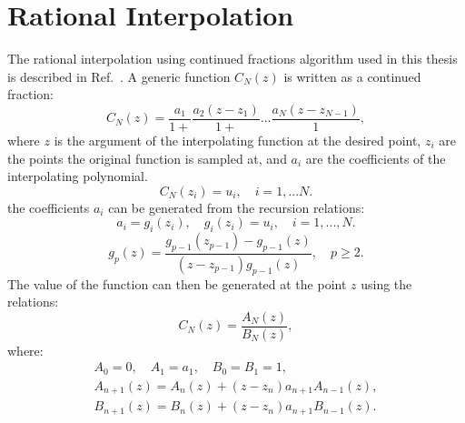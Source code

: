 \chapter{Rational Interpolation}
\label{app:ratint}
The rational interpolation using continued fractions algorithm
used in this thesis is described in Ref.~\cite{vidbergserene77}.
A generic function $C_N(z)$ is written as a continued fraction:
%
\begin{equation}
C_{N}(z) = \frac{a_{1}}{1+}\frac{a_{2}(z-z_{1})}{1+}...\frac{a_{N}(z-z_{N-1})}{1},
\end{equation}
%
where $z$ is the argument of the interpolating function
at the desired point, $z_{i}$ are the points the original function is sampled at,
and $a_{i}$ are the coefficients of the interpolating polynomial.
%
\begin{equation}
C_{N}(z_{i}) = u_{i}, \quad i=1,...N.
\end{equation}
%
the coefficients $a_{i}$ can be generated from the recursion relations:
%
\begin{equation}
a_{i} = g_{i}(z_{i}),\quad g_{i}(z_{i})=u_{i},\quad i=1,...,N.
\end{equation}
%
\begin{equation}
g_{p}(z) = \frac{g_{p-1}(z_{p-1}) - g_{p-1}(z)}{(z - z_{p-1})g_{p-1}(z)}, \quad p \geq 2.
\end{equation}
%
The value of the function can then be generated at the point $z$ using the relations:
%
\begin{equation}
C_{N}(z) = \frac{A_{N}(z)}{B_{N}(z)},
\end{equation}
%
where:
%
\begin{eqnarray}
A_{0}=0, \quad A_{1} = a_{1}, \quad B_{0}=B_{1}=1, \nonumber \\
A_{n+1}(z) = A_{n}(z) + (z-z_{n})a_{n+1}A_{n-1}(z), \nonumber \\
B_{n+1}(z) = B_{n}(z) + (z-z_{n})a_{n+1}B_{n-1}(z).
\end{eqnarray}


